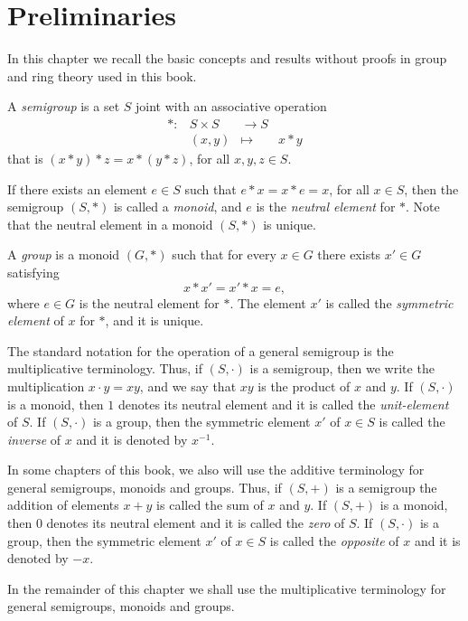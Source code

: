 \chapter{Preliminaries}
\label{preliminaries}


In this chapter we recall the basic concepts and results without proofs in group and ring theory used in this book.

A {\em semigroup} is a set $S$ joint with an associative operation
\[ 
\begin{array}{cccc} *\colon &S\times S&\longrightarrow S\\
&(x,y)&\mapsto&x*y \end{array}
\]
that is $(x*y)*z=x*(y*z)$, for all $x,y,z\in S$.

If there exists an element $e\in S$ such that $e*x=x*e=x$, for all $x\in S$, then the semigroup $(S,*)$ is called a {\em monoid}, and $e$ is the {\em neutral element} for $*$. Note that the neutral element in a monoid $(S,*)$ is unique.

A {\em group} is a monoid $(G,*)$ such that for every $x\in G$ there exists $x'\in G$ satisfying
\[ 
x*x'=x'*x=e,\]
where $e\in G$ is the neutral element for $*$. The element $x'$ is called the {\em symmetric element} of $x$ for $*$, and it is unique.

The standard notation for the operation of a general semigroup is the multiplicative terminology. Thus, if $(S,\cdot)$ is a semigroup, then we write the multiplication  $x\cdot y=xy$, and we say that $xy$ is the product of $x$ and $y$. If $(S,\cdot)$  is a monoid, then $1$ denotes its neutral element and it is called the {\em unit-element} of $S$. If $(S,\cdot)$ is a group, then the symmetric element $x'$ of $x\in S$ is called the {\em inverse} of $x$ and it is denoted by $x^{-1}$.

In some chapters of this book, we also will use the additive terminology for general semigroups, monoids and groups. Thus, if $(S,+)$ is a semigroup the addition of elements $x+y$ is called the sum of $x$ and $y$. If $(S,+)$  is a monoid, then $0$ denotes its neutral element and it is called the {\em zero} of $S$. If $(S,\cdot)$ is a group, then the symmetric element $x'$ of $x\in S$ is called the {\em opposite} of $x$ and it is denoted by $-x$.

In the remainder of this chapter we shall use the multiplicative terminology for general semigroups, monoids and groups.

